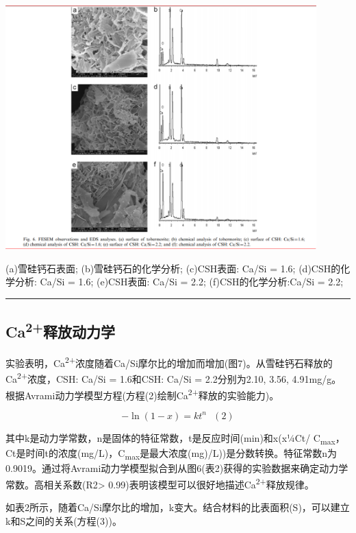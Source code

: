 \documentclass[11pt]{article}
\begin{document}
\includegraphics[width=0.9\textwidth]{fig.6.png}
 \label{tab:title}

(a)雪硅钙石表面;
(b)雪硅钙石的化学分析;
(c)CSH表面: Ca/Si = 1.6;
(d)CSH的化学分析: Ca/Si = 1.6;
(e)CSH表面: Ca/Si = 2.2;
(f)CSH的化学分析:Ca/Si = 2.2;

\noindent\rule{\textwidth}{0.5pt}


\subsection{Ca\textsuperscript{2+}释放动力学}
\label{sec:orgd4f9b7f}
\setlength{\parindent}{1.0cm}
实验表明，Ca\textsuperscript{2+}浓度随着Ca/Si摩尔比的增加而增加(图7)。从雪硅钙石释放的
Ca\textsuperscript{2+}浓度，CSH: Ca/Si = 1.6和CSH: Ca/Si = 2.2分别为2.10, 3.56, 4.91mg/g。
根据Avrami动力学模型方程(方程(2)绘制Ca\textsuperscript{2+}释放的实验能力)。\cite{demirkıran07_dissol_kinet_ulexit_perch_acid_solut}
\par

\[-\ln(1-x) = kt^{n} \ \ \ (2)\]

\setlength{\parindent}{1.0cm}
其中k是动力学常数，n是固体的特征常数，t是反应时间(min)和x(x¼Ct/ C\textsubscript{max}，Ct是时间t的浓度(mg/L)，C\textsubscript{max}是最大浓度(mg)/L))是分数转换。特征常数n为0.9019。通过将Avrami动力学模型拟合到从图6(表2)获得的实验数据来确定动力学常数。高相关系数(R2> 0.99)表明该模型可以很好地描述Ca\textsuperscript{2+}释放规律。
\par


\setlength{\parindent}{1.0cm}
如表2所示，随着Ca/Si摩尔比的增加，k变大。结合材料的比表面积(S)，可以建立k和S之间的关系(方程(3))。
\par
\end{document}
